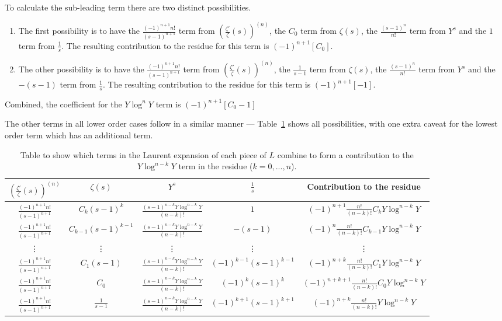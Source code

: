 \documentclass[12pt,a4paper,reqno]{amsart}
\theoremstyle{remark}
\numberwithin{equation}{section}
\begin{document}
To calculate the sub-leading term there are two distinct possibilities.
\begin{enumerate}
\item The first possibility is to have the $\frac{(-1)^{n+1} n!}{(s-1)^{n+1}}$ term from $\left( \frac{\zeta'}{\zeta}(s) \right)^{(n)}$, the $C_0$ term from $\zeta(s)$, the $\frac{(s-1)^{n}}{n!}$ term from $Y^s$ and the $1$ term from $\frac{1}{s}$. The resulting contribution to the residue for this term is $(-1)^{n+1} [C_0]$.
\item The other possibility is to have the $\frac{(-1)^{n+1} n!}{(s-1)^{n+1}}$ term from $\left( \frac{\zeta'}{\zeta}(s) \right)^{(n)}$, the $\frac{1}{s-1}$ term from $\zeta(s)$, the $\frac{(s-1)^{n}}{n!}$ term from $Y^s$ and the $-(s-1)$ term from $\frac{1}{s}$. The resulting contribution to the residue for this term is $(-1)^{n+1} [-1]$.
\end{enumerate}
Combined, the coefficient for the $Y \log^{n} Y$ term is $(-1)^{n+1} [C_0 -1]$

The other terms in all lower order cases follow in a similar manner --- Table~\ref{table:3} shows all possibilities, with one extra caveat for the lowest order term which has an additional term.
\FloatBarrier

\begin{table}[htp]\small
\centering
\begin{tabular}{||c c c c | c||}
 \hline
$\left( \frac{\zeta'}{\zeta}(s) \right)^{(n)}$ & $\zeta(s)$ & $Y^s$ & $\frac{1}{s}$ & Contribution to the residue \\ [1ex]
 \hline \hline
$\frac{(-1)^{n+1} n!}{(s-1)^{n+1}}$ & $C_k(s-1)^k$ & $\frac{(s-1)^{n-k}Y \log^{n-k} Y}{(n-k)!}$ & $1$ & $ (-1)^{n+1} \frac{n!}{(n-k)!} C_k Y \log^{n-k} Y$ \\ [1ex]
\hline
$\frac{(-1)^{n+1} n!}{(s-1)^{n+1}}$ & $C_{k-1}(s-1)^{k-1}$ & $\frac{(s-1)^{n-k}Y \log^{n-k} Y}{(n-k)!}$ & $-(s-1)$ & $ (-1)^{n} \frac{n!}{(n-k)!} C_{k-1} Y \log^{n-k} Y$ \\ [1ex]
\hline
\vdots & \vdots & \vdots & \vdots & \vdots \\ [1ex]
\hline
$\frac{(-1)^{n+1} n!}{(s-1)^{n+1}}$ & $C_{1}(s-1)$ & $\frac{(s-1)^{n-k}Y \log^{n-k} Y}{(n-k)!}$ & $(-1)^{k-1}(s-1)^{k-1}$ & $ (-1)^{n+k} \frac{n!}{(n-k)!} C_{1} Y \log^{n-k} Y$ \\ [1ex]
\hline
$\frac{(-1)^{n+1} n!}{(s-1)^{n+1}}$ & $C_{0}$ & $\frac{(s-1)^{n-k}Y \log^{n-k} Y}{(n-k)!}$ & $(-1)^{k}(s-1)^k$ & $(-1)^{n+k+1} \frac{n!}{(n-k)!} C_{0} Y \log^{n-k} Y$ \\ [1ex]
\hline
$\frac{(-1)^{n+1} n!}{(s-1)^{n+1}}$ & $\frac{1}{s-1}$  & $\frac{(s-1)^{n-k}Y \log^{n-k} Y}{(n-k)!}$ & $(-1)^{k+1}(s-1)^{k+1}$ & $ (-1)^{n+k} \frac{n!}{(n-k)!} Y \log^{n-k} Y$ \\ [1ex]
\hline
\end{tabular}
\caption{Table to show which terms in the Laurent expansion of each piece of $L$ combine to form a contribution to the $Y \log^{n-k} Y$ term in the residue ($k=0,...,n$).}
\label{table:3}
\end{table}
\end{document}
